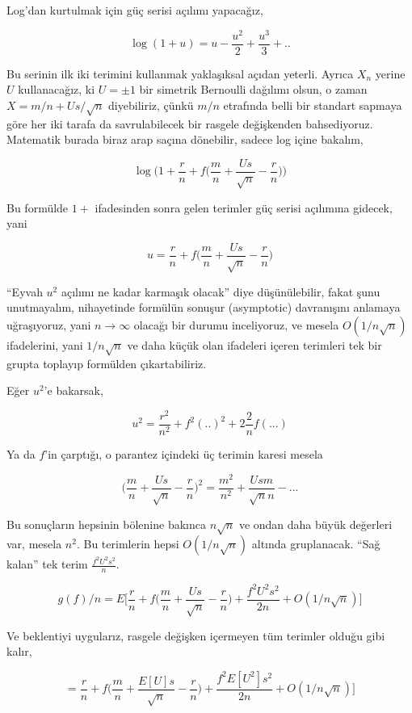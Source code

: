 \documentclass[12pt,fleqn]{article}\usepackage{../../common}
\begin{document}
Log'dan kurtulmak için güç serisi açılımı yapacağız, 

$$ \log(1+u) = u - \frac{u^2}{2} + \frac{u^3}{3} + .. $$

Bu serinin ilk iki terimini kullanmak yaklaşıksal açıdan yeterli. Ayrıca
$X_n$ yerine $U$ kullanacağız, ki $U = \pm 1$ bir simetrik Bernoulli
dağılımı olsun, o zaman $X = m/n + U s/\sqrt{n}$ diyebiliriz, çünkü $m/n$
etrafında belli bir standart sapmaya göre her iki tarafa da savrulabilecek
bir rasgele değişkenden bahsediyoruz. Matematik burada biraz arap saçına
dönebilir, sadece log içine bakalım,

$$ \log \bigg( 
1 + \frac{r}{n} + f \big( \frac{m}{n} + \frac{Us}{\sqrt{n}} - \frac{r}{n} \big) 
\bigg)  $$

Bu formülde $1+$ ifadesinden sonra gelen terimler güç serisi açılımına
gidecek, yani 

$$ u = \frac{r}{n} + f \big( \frac{m}{n} + \frac{Us}{\sqrt{n}} - \frac{r}{n} \big)  $$

``Eyvah $u^2$ açılımı ne kadar karmaşık olacak'' diye düşünülebilir, fakat
şunu unutmayalım, nihayetinde formülün sonuşur (asymptotic) davranışını
anlamaya uğraşıyoruz, yani $n \to \infty$ olacağı bir durumu inceliyoruz,
ve mesela $O(1/n \sqrt{n})$ ifadelerini, yani $1/n \sqrt{n}$ ve daha küçük
olan ifadeleri içeren terimleri tek bir grupta toplayıp formülden
çıkartabiliriz. 

Eğer $u^2$'e bakarsak, 

$$ u^2 = \frac{r^2}{n^2} + f^2(..)^2 + 2 \frac{2}{n}f(...) $$

Ya da $f$'in çarptığı, o parantez içindeki üç terimin karesi mesela

$$ \big( \frac{m}{n} + \frac{Us}{\sqrt{n}} - \frac{r}{n} \big)^2 
= \frac{m^2}{n^2} + \frac{Usm}{\sqrt{n}n} - ...
$$

Bu sonuçların hepsinin bölenine bakınca $n\sqrt{n}$ ve ondan daha büyük
değerleri var, mesela $n^2$. Bu terimlerin hepsi $O(1/n \sqrt{n})$ altında
gruplanacak. ``Sağ kalan'' tek terim $\frac{f^2U^2s^2}{n}$. 

$$ 
g(f)/n = 
E\big[
\frac{r}{n} + f \big( \frac{m}{n} + \frac{Us}{\sqrt{n}} - \frac{r}{n} \big) + 
\frac{f^2U^2s^2}{2n} + 
O(1/n \sqrt{n})
\big]
$$

Ve beklentiyi uygularız, rasgele değişken içermeyen tüm terimler olduğu
gibi kalır, 

$$ 
= \frac{r}{n} + f \big( \frac{m}{n} + \frac{E[U]s}{\sqrt{n}} - \frac{r}{n} \big) + 
\frac{f^2E[U^2]s^2}{2n} + 
O(1/n \sqrt{n})
\big]
$$
\end{document}
